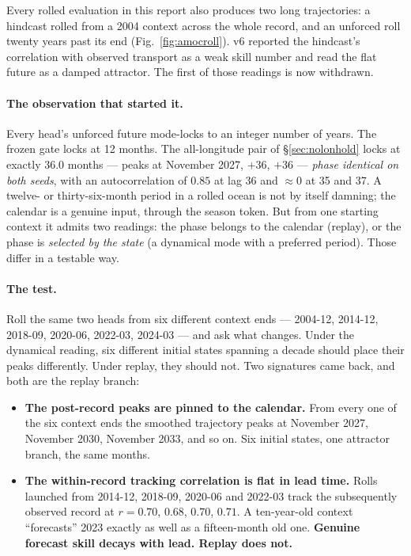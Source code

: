 \documentclass[10pt]{article}
\begin{document}
Every rolled evaluation in this report also produces two long trajectories:
a hindcast rolled from a 2004 context across the whole record, and an
unforced roll twenty years past its end (Fig.~\ref{fig:amocroll}). v6
reported the hindcast's correlation with observed transport as a weak skill
number and read the flat future as a damped attractor. The first of those
readings is now withdrawn.

\paragraph{The observation that started it.} Every head's unforced future
mode-locks to an integer number of years. The frozen gate locks at 12
months. The all-longitude pair of \S\ref{sec:nolonhold} locks at exactly
$36.0$ months --- peaks at November 2027, $+36$, $+36$ --- \emph{phase
identical on both seeds}, with an autocorrelation of $0.85$ at lag 36 and
$\approx$$0$ at 35 and 37. A twelve- or thirty-six-month period in a rolled
ocean is not by itself damning; the calendar is a genuine input, through the
season token. But from one starting context it admits two readings: the
phase belongs to the calendar (replay), or the phase is \emph{selected by
the state} (a dynamical mode with a preferred period). Those differ in a
testable way.

\paragraph{The test.} Roll the same two heads from six different context
ends --- 2004-12, 2014-12, 2018-09, 2020-06, 2022-03, 2024-03 --- and ask
what changes. Under the dynamical reading, six different initial states
spanning a decade should place their peaks differently. Under replay, they
should not. Two signatures came back, and both are the replay branch:

\begin{itemize}\itemsep2pt
\item \textbf{The post-record peaks are pinned to the calendar.} From every
  one of the six context ends the smoothed trajectory peaks at November
  2027, November 2030, November 2033, and so on. Six initial states, one
  attractor branch, the same months.
\item \textbf{The within-record tracking correlation is flat in lead time.}
  Rolls launched from 2014-12, 2018-09, 2020-06 and 2022-03 track the
  subsequently observed record at $r = 0.70$, $0.68$, $0.70$, $0.71$. A
  ten-year-old context ``forecasts'' 2023 exactly as well as a fifteen-month
  old one. \textbf{Genuine forecast skill decays with lead. Replay does
  not.}
\end{itemize}
\end{document}
